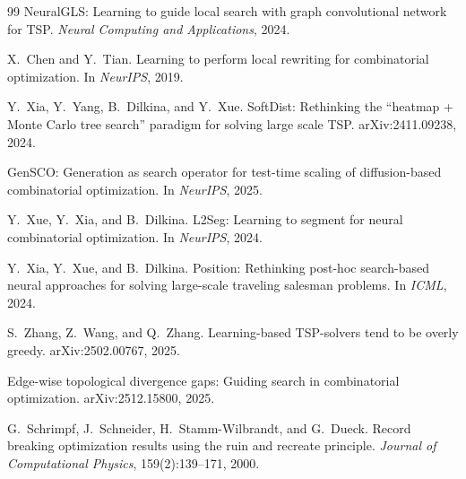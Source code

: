 \documentclass[11pt,a4paper]{ctexart}
\begin{document}
\begin{thebibliography}{99}
NeuralGLS: Learning to guide local search with graph convolutional network for TSP.
\newblock \emph{Neural Computing and Applications}, 2024.

X.~Chen and Y.~Tian.
\newblock Learning to perform local rewriting for combinatorial optimization.
\newblock In \emph{NeurIPS}, 2019.

Y.~Xia, Y.~Yang, B.~Dilkina, and Y.~Xue.
\newblock SoftDist: Rethinking the ``heatmap + Monte Carlo tree search'' paradigm for solving large scale TSP.
\newblock arXiv:2411.09238, 2024.

GenSCO: Generation as search operator for test-time scaling of diffusion-based combinatorial optimization.
\newblock In \emph{NeurIPS}, 2025.

Y.~Xue, Y.~Xia, and B.~Dilkina.
\newblock L2Seg: Learning to segment for neural combinatorial optimization.
\newblock In \emph{NeurIPS}, 2024.

Y.~Xia, Y.~Xue, and B.~Dilkina.
\newblock Position: Rethinking post-hoc search-based neural approaches for solving large-scale traveling salesman problems.
\newblock In \emph{ICML}, 2024.

S.~Zhang, Z.~Wang, and Q.~Zhang.
\newblock Learning-based TSP-solvers tend to be overly greedy.
\newblock arXiv:2502.00767, 2025.

Edge-wise topological divergence gaps: Guiding search in combinatorial optimization.
\newblock arXiv:2512.15800, 2025.

G.~Schrimpf, J.~Schneider, H.~Stamm-Wilbrandt, and G.~Dueck.
\newblock Record breaking optimization results using the ruin and recreate principle.
\newblock \emph{Journal of Computational Physics}, 159(2):139--171, 2000.

\end{thebibliography}
\end{document}
